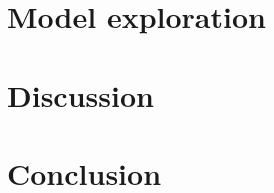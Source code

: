\section{Model exploration}













\section{Discussion}







\section*{Conclusion}















